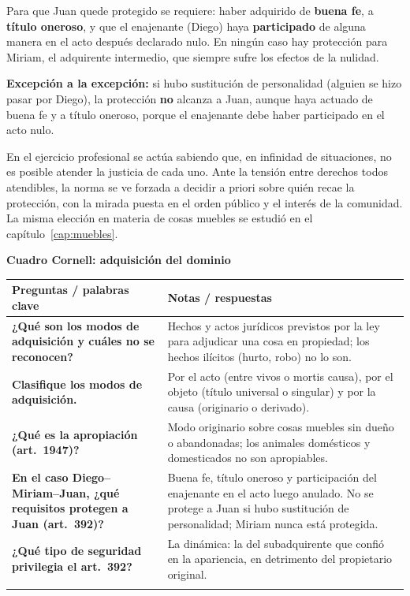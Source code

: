 \documentclass[12pt,oneside]{book}
\renewcommand{\arraystretch}{1.25}
\newcommand{\cq}[2]{\textbf{#1} & #2 \\[0.45em]}
\newcommand{\cornell}[3]{%
\par\bigskip\noindent\textbf{\large Cuadro Cornell: #1}\par\smallskip
\begin{center}
\small
\renewcommand{\arraystretch}{1.15}
\begin{tabularx}{\textwidth}{>{\raggedright\arraybackslash}p{0.27\textwidth}>{\raggedright\arraybackslash}X}
\toprule
\textbf{Preguntas / palabras clave} & \textbf{Notas / respuestas} \\
\midrule
#2
\midrule
\multicolumn{2}{p{\dimexpr\textwidth-2\tabcolsep\relax}}{\textbf{Resumen.} #3} \\
\bottomrule
\end{tabularx}
\end{center}
}
\begin{document}
Para que Juan quede protegido se requiere: haber adquirido de \textbf{buena fe}, a \textbf{título oneroso}, y que el enajenante (Diego) haya \textbf{participado} de alguna manera en el acto después declarado nulo. En ningún caso hay protección para Miriam, el adquirente intermedio, que siempre sufre los efectos de la nulidad.

\begin{importante}
\textbf{Excepción a la excepción:} si hubo sustitución de personalidad (alguien se hizo pasar por Diego), la protección \textbf{no} alcanza a Juan, aunque haya actuado de buena fe y a título oneroso, porque el enajenante debe haber participado en el acto nulo.
\end{importante}

\begin{nota}
En el ejercicio profesional se actúa sabiendo que, en infinidad de situaciones, no es posible atender la justicia de cada uno. Ante la tensión entre derechos todos atendibles, la norma se ve forzada a decidir a priori sobre quién recae la protección, con la mirada puesta en el orden público y el interés de la comunidad. La misma elección en materia de cosas muebles se estudió en el capítulo~\ref{cap:muebles}.
\end{nota}

\cornell{adquisición del dominio}{
\cq{¿Qué son los modos de adquisición y cuáles no se reconocen?}{Hechos y actos jurídicos previstos por la ley para adjudicar una cosa en propiedad; los hechos ilícitos (hurto, robo) no lo son.}
\cq{Clasifique los modos de adquisición.}{Por el acto (entre vivos o mortis causa), por el objeto (título universal o singular) y por la causa (originario o derivado).}
\cq{¿Qué es la apropiación (art.~1947)?}{Modo originario sobre cosas muebles sin dueño o abandonadas; los animales domésticos y domesticados no son apropiables.}
\cq{En el caso Diego–Miriam–Juan, ¿qué requisitos protegen a Juan (art.~392)?}{Buena fe, título oneroso y participación del enajenante en el acto luego anulado. No se protege a Juan si hubo sustitución de personalidad; Miriam nunca está protegida.}
\cq{¿Qué tipo de seguridad privilegia el art.~392?}{La dinámica: la del subadquirente que confió en la apariencia, en detrimento del propietario original.}
}{El dominio se adquiere por modos originarios (apropiación, prescripción) o derivados (título y modo). El subadquirente de inmuebles de buena fe y a título oneroso queda protegido frente a la nulidad del acto anterior si el titular participó en él, con prioridad de la seguridad dinámica.}
\end{document}
